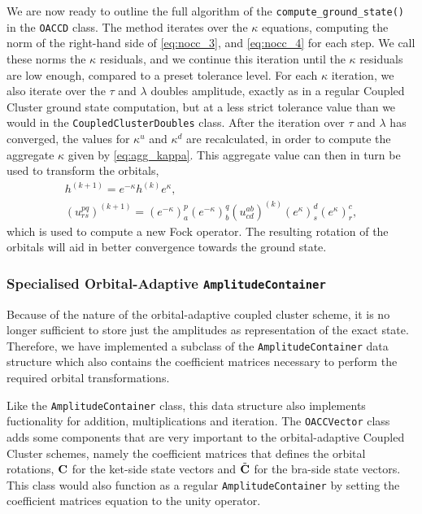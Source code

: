     We are now ready to outline the full algorithm of the 
    \lstinline{compute_ground_state()} in the \lstinline{OACCD}
    class.
    The method iterates over the $\kappa$ equations, computing the norm of
    the right-hand side 
    of \autoref{eq:nocc_3}, and \autoref{eq:nocc_4} for each step. 
    We call these norms the $\kappa$ residuals, and we continue this iteration until 
    the $\kappa$ residuals are low enough, compared to a preset tolerance level. 
    For each $\kappa$ iteration, we also iterate over the $\tau$ and $\lambda$ doubles 
    amplitude, exactly as in a regular Coupled Cluster ground state computation,
    but at a less strict tolerance value than we would in the
    \lstinline{CoupledClusterDoubles} class.
    After the iteration over $\tau$ and $\lambda$ 
    has converged, the values for $\kappa^u$ and $\kappa^d$ are recalculated, in order to 
    compute the aggregate $\kappa$ given by \autoref{eq:agg_kappa}. 
    This aggregate value can then in turn be used to transform the orbitals,
    \begin{equation*}
        \begin{gathered}
            h^{(k + 1)} = e^{-\kappa} h^{(k)} e^{\kappa}, \\
            (u^{pq}_{rs})^{(k + 1)}
            = (e^{-\kappa})^p_a (e^{-\kappa})^q_b 
                (u^{ab}_{cd})^{(k)}
            (e^{\kappa})^d_s (e^{\kappa})^c_r,
        \end{gathered}
    \end{equation*}
    which is used to compute 
    a new Fock operator. The resulting rotation of the orbitals will aid in better 
    convergence towards the ground state.

    

    \subsubsection{Specialised Orbital-Adaptive \lstinline{AmplitudeContainer}}

    Because of the nature of the orbital-adaptive coupled cluster scheme, it is no 
    longer sufficient to store just the amplitudes as representation of the exact 
    state. Therefore, we have implemented a subclass of the \lstinline{AmplitudeContainer}
    data structure which also contains the coefficient matrices necessary to perform the 
    required orbital transformations.

    Like the \lstinline{AmplitudeContainer} class, this data structure also implements 
    fuctionality for addition, multiplications and iteration. The \lstinline{OACCVector}
    class adds some components 
    that are very important to the orbital-adaptive Coupled Cluster schemes, namely 
    the coefficient matrices that defines the orbital rotations, $\vb{C}$ for the 
    ket-side state vectors and $\tilde{\vb{C}}$ for the bra-side state vectors. This class 
    would also function as a regular \lstinline{AmplitudeContainer} by setting the 
    coefficient matrices equation to the unity operator.
    
